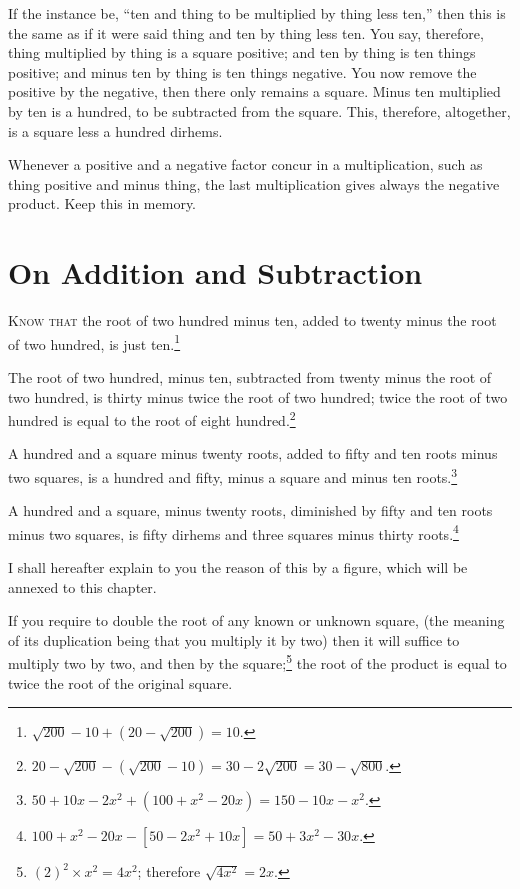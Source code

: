 If the instance be, ``ten and thing to be multiplied by thing less ten,'' then this is the same as if it were said thing and ten by thing less ten. You say, therefore, thing multiplied by thing is a square positive; and ten by thing is ten things positive; and minus ten by thing is ten things negative. You now remove the positive by the negative, then there only remains a square. Minus ten multiplied by ten is a hundred, to be subtracted from the square. This, therefore, altogether, is a square less a hundred dirhems.

Whenever a positive and a negative factor concur in a multiplication, such as thing positive and minus thing, the last multiplication gives always the negative product. Keep this in memory.

\clearpage

\section*{On Addition and Subtraction}

\lettrine{K}{now that} the root of two hundred minus ten, added to twenty minus the root of two hundred, is just ten.\footnote{$\sqrt{200} - 10 + (20 - \sqrt{200}) = 10$.}

The root of two hundred, minus ten, subtracted from twenty minus the root of two hundred, is thirty minus twice the root of two hundred; twice the root of two hundred is equal to the root of eight hundred.\footnote{$20 - \sqrt{200} - (\sqrt{200} - 10) = 30 - 2\sqrt{200} = 30 - \sqrt{800}$.}

A hundred and a square minus twenty roots, added to fifty and ten roots minus two squares, is a hundred and fifty, minus a square and minus ten roots.\footnote{$50 + 10x - 2x^2 + (100 + x^2 - 20x) = 150 - 10x - x^2$.}

A hundred and a square, minus twenty roots, diminished by fifty and ten roots minus two squares, is fifty dirhems and three squares minus thirty roots.\footnote{$100 + x^2 - 20x - [50 - 2x^2 + 10x] = 50 + 3x^2 - 30x$.}

I shall hereafter explain to you the reason of this by a figure, which will be annexed to this chapter.

If you require to double the root of any known or unknown square, (the meaning of its duplication being that you multiply it by two) then it will suffice to multiply two by two, and then by the square;\footnote{$(2)^2 \times x^2 = 4x^2$; therefore $\sqrt{4x^2} = 2x$.} the root of the product is equal to twice the root of the original square.

